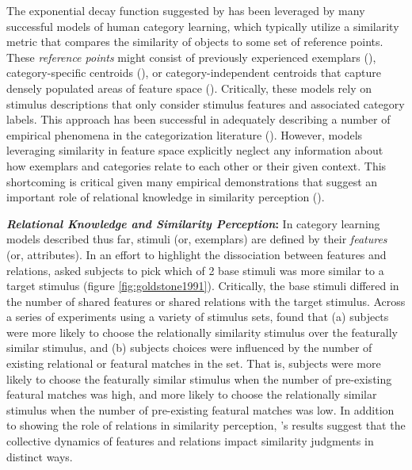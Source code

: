 \documentclass[12pt]{article}
\let\oldcite=\cite
\let\oldtextcite=\textcite
\renewcommand{\cite}[1]{\textcolor[rgb]{0, .121, .388}{\oldcite{#1}}}
\renewcommand{\textcite}[1]{\textcolor[rgb]{0, .121, .388}{\oldtextcite{#1}}}
\begin{document}
The exponential decay function suggested by \textcite{shepard1987toward} has been leveraged by many successful models of human category learning, which typically utilize a similarity metric that compares the similarity of objects to some set of reference points. These \emph{reference points} might consist of previously experienced exemplars (\cite{nosofsky2011generalized,kruschke1992alcove}), category-specific centroids (\cite{minda2001prototypes,}), or category-independent centroids that capture densely populated areas of feature space (\cite{love2004sustain,rosseel2002mixture}). Critically, these models rely on stimulus descriptions that only consider stimulus features and associated category labels. This approach has been successful in adequately describing a number of empirical phenomena in the categorization literature (\cite{nosofsky1994comparing,kruschke1993human}). However, models leveraging similarity in feature space explicitly neglect any information about how exemplars and categories relate to each other or their given context. This shortcoming is critical given many empirical demonstrations that suggest an important role of relational knowledge in similarity perception (\cite{goldstone1991relational,markman1993structural,goldstone1994similarity}).

\textbf{\emph{Relational Knowledge and Similarity Perception}:} In category learning models described thus far, stimuli (or, exemplars) are defined by their \emph{features} (or, attributes). In an effort to highlight the dissociation between features and relations, \textcite{goldstone1991relational} asked subjects to pick which of 2 base stimuli was more similar to a target stimulus (figure \ref{fig:goldstone1991}). Critically, the base stimuli differed in the number of shared features or shared relations with the target stimulus. Across a series of experiments using a variety of stimulus sets, \textcite{goldstone1991relational} found that (a) subjects were more likely to choose the relationally similarity stimulus over the featurally similar stimulus, and (b) subjects choices were influenced by the number of existing relational or featural matches in the set. That is, subjects were more likely to choose the featurally similar stimulus when the number of pre-existing featural matches was high, and more likely to choose the relationally similar stimulus when the number of pre-existing featural matches was low. In addition to showing the role of relations in similarity perception, \textcite{goldstone1991relational}'s results suggest that the collective dynamics of features and relations impact similarity judgments in distinct ways.
\end{document}
